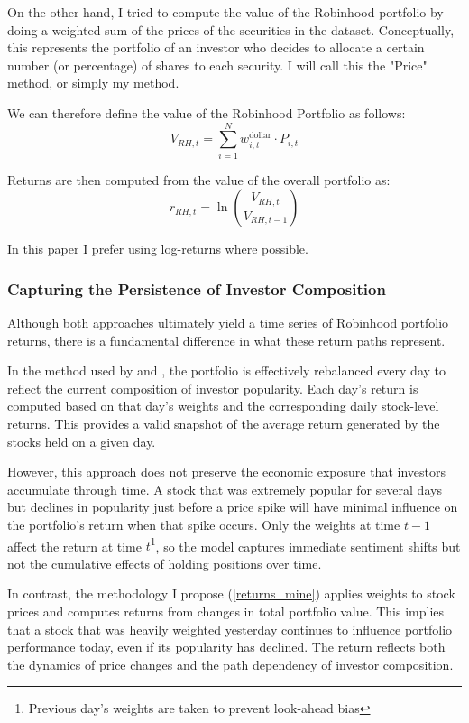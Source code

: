 On the other hand, I tried to compute the value of the Robinhood portfolio by doing a weighted sum of the prices of the securities in the dataset.
Conceptually, this represents the portfolio of an investor who decides to allocate a certain number (or percentage) of shares to each security.
I will call this the "Price" method, or simply my method.

We can therefore define the value of the Robinhood Portfolio as follows:
\begin{equation}
    V_{RH,t}=\sum_{i=1}^N w^{\text{dollar}}_{i,t}\cdot P_{i,t}
    \label{value_mine}
\end{equation}

Returns are then computed from the value of the overall portfolio as:
\begin{equation}
    r_{RH,t} = \ln\left(\frac{V_{RH,t}}{V_{RH,t-1}}\right)
\label{returns_mine}
\end{equation}

In this paper I prefer using log-returns where possible. 

\subsubsection{Capturing the Persistence of Investor Composition}
Although both approaches ultimately yield a time series of Robinhood portfolio returns, there is a fundamental difference in what these return paths represent.

In the method used by \cite{Fedyk2024} and \cite{Welch2022}, the portfolio is effectively rebalanced every day to reflect the current composition of investor popularity.
Each day's return is computed based on that day's weights and the corresponding daily stock-level returns.
This provides a valid snapshot of the average return generated by the stocks held on a given day.

However, this approach does not preserve the economic exposure that investors accumulate through time.
A stock that was extremely popular for several days but declines in popularity just before a price spike will have minimal influence on the portfolio's return when that spike occurs.
Only the weights at time $t-1$ affect the return at time $t$\footnote{Previous day's weights are taken to prevent look-ahead bias}, so the model captures immediate sentiment shifts but not the cumulative effects of holding positions over time.

In contrast, the methodology I propose (\ref{returns_mine}) applies weights to stock prices and computes returns from changes in total portfolio value.
This implies that a stock that was heavily weighted yesterday continues to influence portfolio performance today, even if its popularity has declined.
The return reflects both the dynamics of price changes and the path dependency of investor composition.

